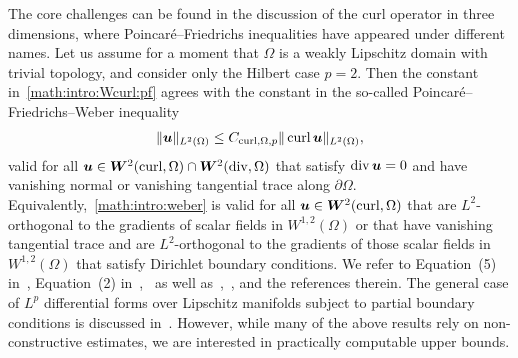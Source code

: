 \documentclass[10pt,a4paper]{article}
\begin{document}
The core challenges can be found in the discussion of the curl operator in three dimensions,
where Poincar\'e--Friedrichs inequalities have appeared under different names. 
Let us assume for a moment that $\Omega$ is a weakly Lipschitz domain with trivial topology, and consider only the Hilbert case $p=2$. 
Then the constant in~\eqref{math:intro:Wcurl:pf} agrees with the constant in the so-called Poincar\'e--Friedrichs--Weber inequality
\begin{align}
    \label{math:intro:weber}
    \| \bm{u}\|_{L^{2}(\Omega)}   \leq C_{\operatorname{curl},\Omega,p} \| \operatorname{curl} \bm{u} \|_{L^{2}(\Omega)},
\end{align}
valid for all $\bm{u} \in \bm{W}^{2}(\operatorname{curl},\Omega) \cap \bm{W}^{2}(\operatorname{div},\Omega)$ that satisfy $\operatorname{div} \bm{u} = 0$ and have vanishing normal or vanishing tangential trace along $\partial \Omega$. 
Equivalently,~\eqref{math:intro:weber} is valid for all $\bm{u} \in \bm{W}^{2}(\operatorname{curl},\Omega)$ that are $L^{2}$-orthogonal to the gradients of scalar fields in $W^{1,2}(\Omega)$
or that have vanishing tangential trace and are $L^{2}$-orthogonal to the gradients of those scalar fields in $W^{1,2}(\Omega)$ that satisfy Dirichlet boundary conditions.
We refer to Equation~(5) in~\cite{Fried_diff_forms_55}, Equation~(2) in~\cite{Gaff_Hilbert_harm_55},~\cite{Web_compact_Maxw_80} as well as~\cite[Lemmas~3.4 and~3.6]{Gir_Rav_NS_86},~\cite[Proposition~7.4]{Fer_Gil_Maxw_BC_97}, and the references therein. 
The general case of $L^p$ differential forms over Lipschitz manifolds subject to partial boundary conditions is discussed in~\cite{goldshtein2011hodge}.
However, while many of the above results rely on non-constructive estimates, 
we are interested in practically computable upper bounds. 
\end{document}
